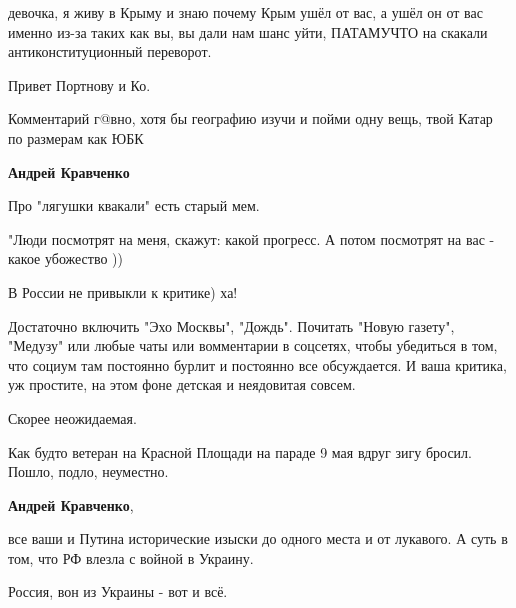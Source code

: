\begin{itemize}
\begin{itemize}
девочка, я живу в Крыму и знаю почему Крым ушёл от вас, а ушёл он от вас именно
из-за таких как вы, вы дали нам шанс уйти, ПАТАМУЧТО на скакали
антиконституционный переворот.

Привет Портнову и Ко.

Комментарий г@вно, хотя бы географию изучи и пойми одну вещь, твой Катар по
размерам как ЮБК


 
\textbf{Андрей Кравченко} 

Про "лягушки квакали" есть старый мем.

"Люди посмотрят на меня, скажут: какой прогресс. А потом посмотрят на вас -
какое убожество ))

 

В России не привыкли к критике) ха!

Достаточно включить "Эхо Москвы", "Дождь". Почитать "Новую газету", "Медузу"
или любые чаты или вомментарии в соцсетях, чтобы убедиться в том, что социум
там постоянно бурлит и постоянно все обсуждается. И ваша критика, уж простите,
на этом фоне детская и неядовитая совсем.

Скорее неожидаемая.

Как будто ветеран на Красной Площади на параде 9 мая вдруг зигу бросил. Пошло,
подло, неуместно.


 
\textbf{Андрей Кравченко}, 

все ваши и Путина исторические изыски до одного места и от лукавого. А суть в
том, что РФ влезла с войной в Украину. 

Россия, вон из Украины - вот и всё.

 

\end{itemize}
\end{itemize}

